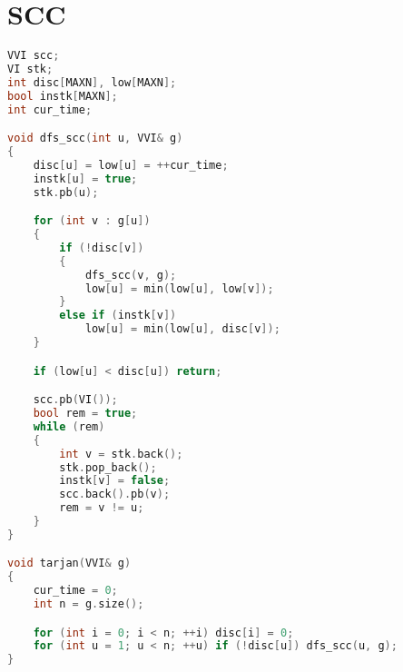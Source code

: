 \section{SCC}
\begin{lstlisting}[language=C++]
VVI scc;
VI stk;
int disc[MAXN], low[MAXN];
bool instk[MAXN];
int cur_time;

void dfs_scc(int u, VVI& g)
{
    disc[u] = low[u] = ++cur_time;
    instk[u] = true;
    stk.pb(u);

    for (int v : g[u])
    {
        if (!disc[v])
        {
            dfs_scc(v, g);
            low[u] = min(low[u], low[v]);
        }
        else if (instk[v])
            low[u] = min(low[u], disc[v]);
    }

    if (low[u] < disc[u]) return;

    scc.pb(VI());
    bool rem = true;
    while (rem)
    {
        int v = stk.back();
        stk.pop_back();
        instk[v] = false;
        scc.back().pb(v);
        rem = v != u;
    }
}

void tarjan(VVI& g)
{
    cur_time = 0;
    int n = g.size();

    for (int i = 0; i < n; ++i) disc[i] = 0;
    for (int u = 1; u < n; ++u) if (!disc[u]) dfs_scc(u, g);
}
\end{lstlisting}
\sectionend
